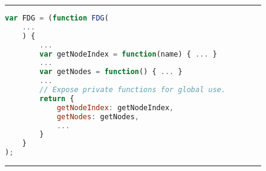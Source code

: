 \begin{figure}[h]
\noindent\rule{\textwidth}{1pt}
\begin{lstlisting}[language=JavaScript, caption={Use of Module pattern in stripped down FDG}, label={lst:module}]
var FDG = (function FDG(
    ...
    ) {
        ...
        var getNodeIndex = function(name) { ... }
        ...
        var getNodes = function() { ... }
        ...
        // Expose private functions for global use.
        return {
            getNodeIndex: getNodeIndex,
            getNodes: getNodes,
            ...
        }
    }
);
\end{lstlisting}
\noindent\rule{\textwidth}{1pt}
\end{figure}
